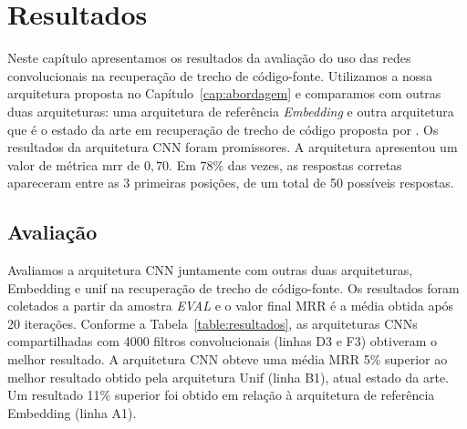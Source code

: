 \chapter{Resultados}
\label{cap:resultados}

Neste capítulo apresentamos os resultados da avaliação do uso das redes convolucionais na recuperação de trecho de código-fonte. Utilizamos a nossa arquitetura proposta no Capítulo~\ref{cap:abordagem} e comparamos com outras duas arquiteturas: uma arquitetura de referência \textit{Embedding} e outra arquitetura que é o estado da arte em recuperação de trecho de código proposta por . Os resultados da arquitetura CNN foram promissores. A arquitetura apresentou um valor de métrica \acrfull{mrr} de $0,70$. Em $78\%$ das vezes, as respostas corretas apareceram entre as 3 primeiras posições, de um total de 50 possíveis respostas.

\section{Avaliação}
\label{sec:resultados-avaliacao}

Avaliamos a arquitetura CNN juntamente com outras duas arquiteturas, Embedding e \Gls{unif} na recuperação de trecho de código-fonte. Os resultados foram coletados a partir da amostra \emph{EVAL} e o valor final MRR é a média obtida após 20 iterações. Conforme a Tabela~\ref{table:resultados}, as arquiteturas CNNs compartilhadas com 4000 filtros convolucionais (linhas D3 e F3) obtiveram o melhor resultado. A arquitetura CNN obteve uma média MRR 5\% superior ao melhor resultado obtido pela arquitetura Unif (linha B1), atual estado da arte. Um resultado 11\% superior foi obtido em relação à arquitetura de referência Embedding (linha A1). 

